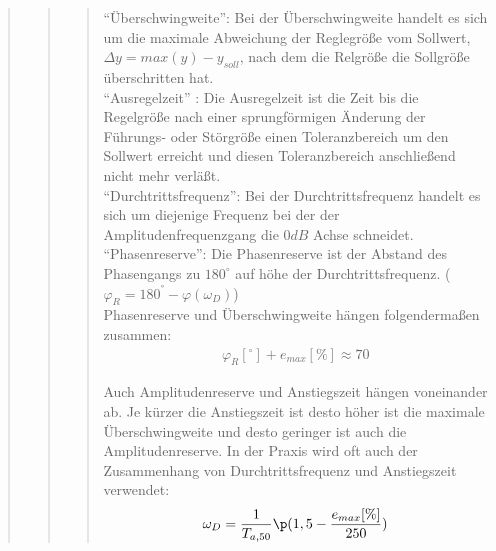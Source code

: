 \begin{quote}
\begin{quote}
\begin{quote}
            \vspace{1em}
            ``Überschwingweite'': Bei der Überschwingweite handelt es sich um die maximale Abweichung der Reglegröße vom
            Sollwert, $\Delta y = max(y) - y_{soll}$, nach dem die Relgröße die Sollgröße überschritten hat.
            \cite{Ueberschwingweite}\\
  
            
            \vspace{1em}
            ``Ausregelzeit'' : Die Ausregelzeit ist die Zeit bis die Regelgröße nach einer sprungförmigen Änderung der
            Führungs- oder Störgröße einen Toleranzbereich um den Sollwert erreicht und diesen Toleranzbereich anschließend
            nicht mehr verläßt.
            \cite{Ausregelzeit}\\

            
            \vspace{1em}
            ``Durchtrittsfrequenz'': Bei der Durchtrittsfrequenz handelt es sich um diejenige Frequenz bei der der
            Amplitudenfrequenzgang die $0dB$ Achse schneidet.\\

            \vspace{1em}
            ``Phasenreserve'': Die Phasenreserve ist der Abstand des Phasengangs zu $180^\circ$ auf höhe der Durchtrittsfrequenz.
            ($\varphi_R = 180^° - \varphi(\omega_D)$)\\
            
            
            \vspace{2em}
            Phasenreserve und Überschwingweite hängen folgendermaßen zusammen:\\
            \begin{equation*}
                \begin{split}
                \varphi_R [^\circ] + e_{max} [\%] \approx 70
                \end{split}
            \end{equation*}
            
            \vspace{1em}
            Auch Amplitudenreserve und Anstiegszeit hängen voneinander ab. Je kürzer die Anstiegszeit ist desto
            höher ist die maximale Überschwingweite und desto geringer ist auch die Amplitudenreserve. In
            der Praxis wird oft auch der Zusammenhang von Durchtrittsfrequenz und Anstiegszeit
            verwendet:
            \begin{equation*}
            \begin{split}
                \omega_D = \frac{1}{T_{a,50}} \p (1,5- \frac{e_{max} [\%]}{250})
            \end{split}
            \end{equation*}
            \cite{krachler}
        \end{quote}


\end{quote}
\end{quote}
